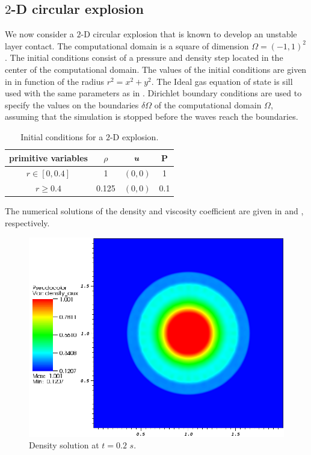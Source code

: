 \subsection{$2$-D circular explosion} \label{sec:2d-circular-explosioin}
We now consider a $2$-D circular explosion \cite{Toro} that is known to develop an unstable layer contact. The computational domain is a square of dimension $\Omega = (-1, 1)^2$. The initial conditions consist of a pressure and density step located in the center of the computational domain. The values of the initial conditions are given in  in function of the radius $r^2 = x^2 + y^2$. The Ideal gas equation of state is sill used with the same parameters as in . Dirichlet boundary conditions are used to specify the values on the boundaries $\delta \Omega$ of the computational domain $\Omega$, assuming that the simulation is stopped before the waves reach the boundaries.
\begin{table}[H] 
\caption{\label{tb:ic-explosion} Initial conditions for a $2$-D explosion.}
\begin{center}
\begin{tabular}{|c|c|c|c|}
\hline
 primitive variables   & $\rho$ & $\boldsymbol u$ & P \\ \hline
 $r \in [ 0, 0.4 ]$& 1 & $(0,0)$ & 1\\ \hline
  $r \geq 0.4$& 0.125 & $(0,0)$ & 0.1\\ \hline
\end{tabular}
\end{center}
\nonumber
\end{table}
The numerical solutions of the density and viscosity coefficient are given in  and , respectively.
%
\begin{figure}[H]
\centering
\includegraphics[scale=.50]{figures/Explosion_density_profiles.png}
\caption{Density solution at $t=0.2$ $s$.}
\label{fig:2d_explosion_density_sct3}
\end{figure}
